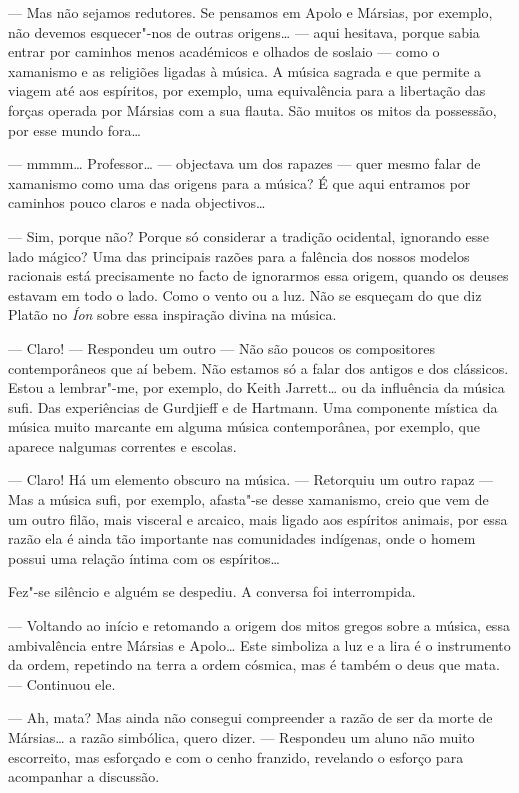 --- Mas não sejamos redutores. Se pensamos em Apolo e Mársias, por
exemplo, não devemos esquecer"-nos de outras origens\ldots{} --- aqui
hesitava, porque sabia entrar por caminhos menos académicos e olhados de
soslaio --- como o xamanismo e as religiões ligadas à música. A música
sagrada e que permite a viagem até aos espíritos, por exemplo, uma
equivalência para a libertação das forças operada por Mársias com a sua
flauta. São muitos os mitos da possessão, por esse mundo fora\ldots{}

--- mmmm\ldots{} Professor\ldots{} --- objectava um dos rapazes --- quer mesmo
falar de xamanismo como uma das origens para a música? É que aqui
entramos por caminhos pouco claros e nada objectivos\ldots{}

--- Sim, porque não? Porque só considerar a tradição ocidental, ignorando
esse lado mágico? Uma das principais razões para a falência dos nossos
modelos racionais está precisamente no facto de ignorarmos essa origem,
quando os deuses estavam em todo o lado. Como o vento ou a luz. Não se
esqueçam do que diz Platão no \emph{Íon }sobre essa inspiração divina na
música.

--- Claro! --- Respondeu um outro --- Não são poucos os compositores
contemporâneos que aí bebem. Não estamos só a falar dos antigos e dos
clássicos. Estou a lembrar"-me, por exemplo, do Keith Jarrett\ldots{} ou
da influência da música sufi. Das experiências de Gurdjieff e de
Hartmann. Uma componente mística da música muito marcante em alguma
música contemporânea, por exemplo, que aparece nalgumas correntes e
escolas.

--- Claro! Há um elemento obscuro na música. --- Retorquiu um outro rapaz ---
Mas a música sufi, por exemplo, afasta"-se desse xamanismo, creio que vem
de um outro filão, mais visceral e arcaico, mais ligado aos espíritos
animais, por essa razão ela é ainda tão importante nas comunidades
indígenas, onde o homem possui uma relação íntima com os espíritos\ldots{}

Fez"-se silêncio e alguém se despediu. A conversa foi interrompida.

--- Voltando ao início e retomando a origem dos mitos gregos sobre a
música, essa ambivalência entre Mársias e Apolo\ldots{} Este simboliza a
luz e a lira é o instrumento da ordem, repetindo na terra a ordem
cósmica, mas é também o deus que mata. --- Continuou ele.

--- Ah, mata? Mas ainda não consegui compreender a razão de ser da morte
de Mársias\ldots{} a razão simbólica, quero dizer. --- Respondeu um aluno não
muito escorreito, mas esforçado e com o cenho franzido, revelando o
esforço para acompanhar a discussão.

